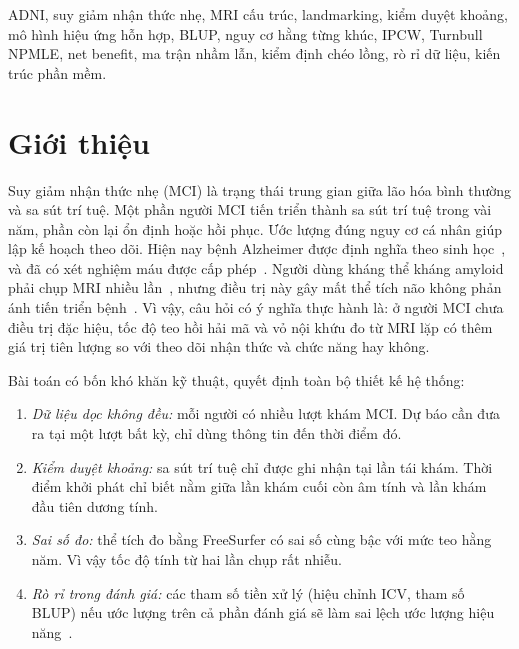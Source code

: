 \documentclass[journal]{IEEEtran}
\begin{document}
\begin{IEEEkeywords}
ADNI, suy giảm nhận thức nhẹ, MRI cấu trúc, landmarking, kiểm duyệt khoảng, mô hình hiệu ứng hỗn hợp, BLUP, nguy cơ hằng từng khúc, IPCW, Turnbull NPMLE, net benefit, ma trận nhầm lẫn, kiểm định chéo lồng, rò rỉ dữ liệu, kiến trúc phần mềm.
\end{IEEEkeywords}

\section{Giới thiệu}
Suy giảm nhận thức nhẹ (MCI) là trạng thái trung gian giữa lão hóa bình thường và sa sút trí tuệ. Một phần người MCI tiến triển thành sa sút trí tuệ trong vài năm, phần còn lại ổn định hoặc hồi phục. Ước lượng đúng nguy cơ cá nhân giúp lập kế hoạch theo dõi. Hiện nay bệnh Alzheimer được định nghĩa theo sinh học~\cite{jack2024}, và đã có xét nghiệm máu được cấp phép~\cite{fda2025}. Người dùng kháng thể kháng amyloid phải chụp MRI nhiều lần~\cite{ema}, nhưng điều trị này gây mất thể tích não không phản ánh tiến triển bệnh~\cite{belder2024}. Vì vậy, câu hỏi có ý nghĩa thực hành là: ở người MCI chưa điều trị đặc hiệu, tốc độ teo hồi hải mã và vỏ nội khứu đo từ MRI lặp có thêm giá trị tiên lượng so với theo dõi nhận thức và chức năng hay không.

Bài toán có bốn khó khăn kỹ thuật, quyết định toàn bộ thiết kế hệ thống:
\begin{enumerate}
\item \emph{Dữ liệu dọc không đều:} mỗi người có nhiều lượt khám MCI. Dự báo cần đưa ra tại một lượt bất kỳ, chỉ dùng thông tin đến thời điểm đó.
\item \emph{Kiểm duyệt khoảng:} sa sút trí tuệ chỉ được ghi nhận tại lần tái khám. Thời điểm khởi phát chỉ biết nằm giữa lần khám cuối còn âm tính và lần khám đầu tiên dương tính.
\item \emph{Sai số đo:} thể tích đo bằng FreeSurfer có sai số cùng bậc với mức teo hằng năm. Vì vậy tốc độ tính từ hai lần chụp rất nhiễu.
\item \emph{Rò rỉ trong đánh giá:} các tham số tiền xử lý (hiệu chỉnh ICV, tham số BLUP) nếu ước lượng trên cả phần đánh giá sẽ làm sai lệch ước lượng hiệu năng~\cite{kaufman2012,varma2006}.
\end{enumerate}
\end{document}
